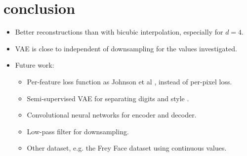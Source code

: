 \section{conclusion}

\begin{itemize}
	\item Better reconstructions than with bicubic interpolation, especially for $d = 4$.
	\item VAE is close to independent of downsampling for the values investigated.
	\item Future work:
	\begin{itemize}
		\item Per-feature loss function as Johnson et al \cite{Johnson16}, instead of per-pixel loss.
		\item Semi-supervised VAE for separating digits and style \cite{Kingma2014}.
		\item Convolutional neural networks for encoder and decoder.
		\item Low-pass filter for downsampling.
		\item Other dataset, e.g. the Frey Face dataset \cite{Frey} using continuous values. 
	\end{itemize}
\end{itemize}
